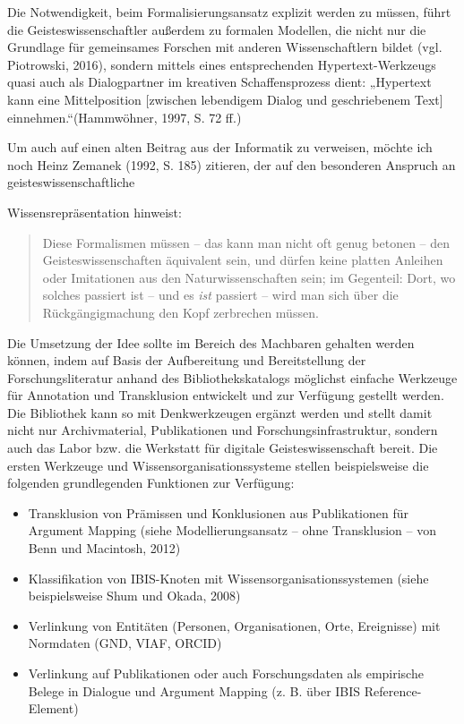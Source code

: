 \documentclass[a4paper,
fontsize=11pt,
oneside,
numbers=noperiodatend,
parskip=half-,
bibliography=totoc,
final
]{scrartcl}
\begin{document}
Die Notwendigkeit, beim Formalisierungsansatz explizit werden zu müssen,
führt die Geisteswissenschaftler außerdem zu formalen Modellen, die
nicht nur die Grundlage für gemeinsames Forschen mit anderen
Wissenschaftlern bildet (vgl. Piotrowski, 2016), sondern mittels eines
entsprechenden Hypertext-Werkzeugs quasi auch als Dialogpartner im
kreativen Schaffensprozess dient: „Hypertext kann eine Mittelposition
{[}zwischen lebendigem Dialog und geschriebenem Text{]}
einnehmen.``(Hammwöhner, 1997, S. 72 ff.)

Um auch auf einen alten Beitrag aus der Informatik zu verweisen, möchte
ich noch Heinz Zemanek (1992, S. 185) zitieren, der auf den besonderen
Anspruch an geisteswissenschaftliche

Wissensrepräsentation hinweist:

\begin{quote}
Diese Formalismen müssen -- das kann man nicht oft genug betonen -- den
Geisteswissenschaften äquivalent sein, und dürfen keine platten Anleihen
oder Imitationen aus den Naturwissenschaften sein; im Gegenteil: Dort,
wo solches passiert ist -- und es \emph{ist} passiert -- wird man sich
über die Rückgängigmachung den Kopf zerbrechen müssen.
\end{quote}

Die Umsetzung der Idee sollte im Bereich des Machbaren gehalten werden
können, indem auf Basis der Aufbereitung und Bereitstellung der
Forschungsliteratur anhand des Bibliothekskatalogs möglichst einfache
Werkzeuge für Annotation und Transklusion entwickelt und zur Verfügung
gestellt werden. Die Bibliothek kann so mit Denkwerkzeugen ergänzt
werden und stellt damit nicht nur Archivmaterial, Publikationen und
Forschungsinfrastruktur, sondern auch das Labor bzw. die Werkstatt für
digitale Geisteswissenschaft bereit. Die ersten Werkzeuge und
Wissensorganisationssysteme stellen beispielsweise die folgenden
grundlegenden Funktionen zur Verfügung:

\begin{itemize}
\tightlist
\item
  Transklusion von Prämissen und Konklusionen aus Publikationen für
  Argument Mapping (siehe Modellierungsansatz -- ohne Transklusion --
  von Benn und Macintosh, 2012)
\item
  Klassifikation von IBIS-Knoten mit Wissensorganisationssystemen (siehe
  beispielsweise Shum und Okada, 2008)
\item
  Verlinkung von Entitäten (Personen, Organisationen, Orte, Ereignisse)
  mit Normdaten (GND, VIAF, ORCID)
\item
  Verlinkung auf Publikationen oder auch Forschungsdaten als empirische
  Belege in Dialogue und Argument Mapping (z. B. über IBIS
  Reference-Element)
\end{itemize}
\end{document}
